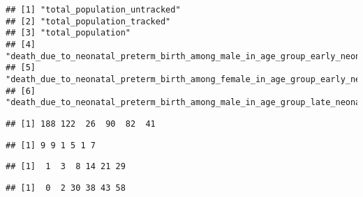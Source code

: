 \documentclass[]{article}
\newenvironment{Shaded}{\begin{snugshade}}{\end{snugshade}}
\newcommand{\NormalTok}[1]{#1}
\newcommand{\OperatorTok}[1]{\textcolor[rgb]{0.81,0.36,0.00}{\textbf{#1}}}
\newcommand{\StringTok}[1]{\textcolor[rgb]{0.31,0.60,0.02}{#1}}
\begin{document}
\begin{verbatim}
## [1] "total_population_untracked"                                                  
## [2] "total_population_tracked"                                                    
## [3] "total_population"                                                            
## [4] "death_due_to_neonatal_preterm_birth_among_male_in_age_group_early_neonatal"  
## [5] "death_due_to_neonatal_preterm_birth_among_female_in_age_group_early_neonatal"
## [6] "death_due_to_neonatal_preterm_birth_among_male_in_age_group_late_neonatal"
\end{verbatim}

\begin{Shaded}
\end{Shaded}

\begin{verbatim}
## [1] 188 122  26  90  82  41
\end{verbatim}

\begin{Shaded}
\end{Shaded}

\begin{verbatim}
## [1] 9 9 1 5 1 7
\end{verbatim}

\begin{Shaded}
\end{Shaded}

\begin{verbatim}
## [1]  1  3  8 14 21 29
\end{verbatim}

\begin{Shaded}
\end{Shaded}

\begin{verbatim}
## [1]  0  2 30 38 43 58
\end{verbatim}
\end{document}
